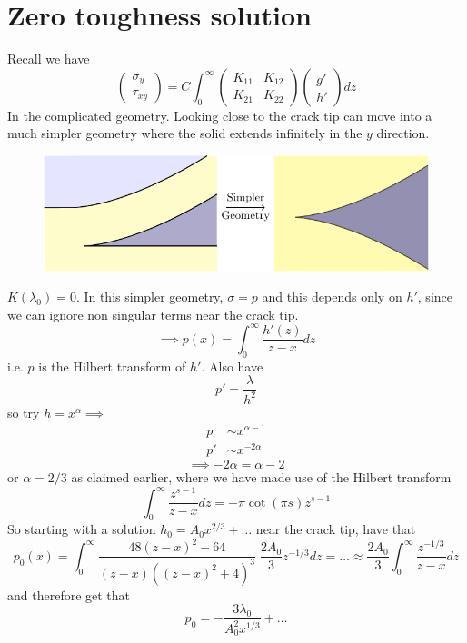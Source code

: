 \documentclass{article}
\begin{document}
\section{Zero toughness solution}
Recall we have
\[ \left( \begin{array}{c} \sigma_y \\ \tau_{xy} \end{array} \right) =
C \int_0^{\infty} \left(
\begin{array}{cc} K_{11} & K_{12} \\ K_{21} & K_{22} \end{array}
\right)
 \left( \begin{array}{c} g' \\ h' \end{array} \right) dz
\]
In the complicated geometry. Looking close to the crack tip can move into a 
much simpler geometry where the solid extends infinitely in the $y$ direction.
\begin{figure}[!ht]\centering
\includegraphics{Fig5.pdf}
\end{figure}
$K(\lambda_0)=0$.
In this simpler geometry, $\sigma = p$ and this depends only on $h'$,
since we can ignore non singular terms near the crack tip.
\[ \implies p(x) = \int_0^{\infty} \frac{h'(z)}{z-x}dz \]
i.e. $p$ is the Hilbert transform of $h'$. Also have 
\[p' = \frac{\lambda}{h^2} \]
so try $h=x^{\alpha}\implies$
\begin{align*}
p  &\sim x^{\alpha-1}\\
p' &\sim x^{-2\alpha}
\end{align*}
\[\implies -2\alpha = \alpha -2 \]
or $\alpha = 2/3$ as claimed earlier,
where we have made use of the Hilbert transform
\[ \int_0^{\infty} \frac{z^{s-1}}{z-x} dz = -\pi \cot(\pi s) z^{s-1}\]
So starting with a solution $h_0 = A_0x^{2/3}+ \dots$ near the
crack tip, have that 
\[ p_0(x) = \int_0^{\infty} \frac{48(z-x)^2-64}{(z-x)((z-x)^2+4)^3}
\; \frac{2A_0}{3} z^{-1/3} dz = \dots \approx \frac{2A_0}{3}\int_0^{\infty} 
\frac{z^{-1/3}}{z-x}dz\]
and therefore get that
\[p_0 = -\frac{3\lambda_0}{A_0^2x^{1/3}} + \dots\] 
\end{document}
